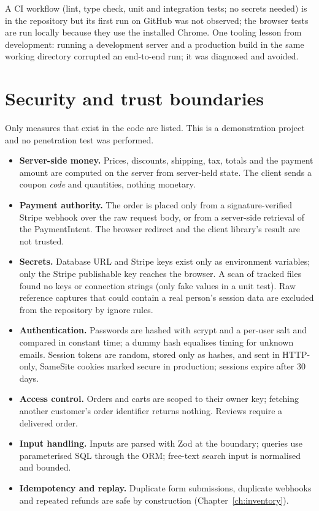 A CI workflow (lint, type check, unit and integration tests; no secrets needed) is in the repository but its first run on GitHub was not observed; the browser tests are run locally because they use the installed Chrome. One tooling lesson from development: running a development server and a production build in the same working directory corrupted an end-to-end run; it was diagnosed and avoided.

\section{Security and trust boundaries}

Only measures that exist in the code are listed. This is a demonstration project and no penetration test was performed.

\begin{itemize}
\item \textbf{Server-side money.} Prices, discounts, shipping, tax, totals and the payment amount are computed on the server from server-held state. The client sends a coupon \emph{code} and quantities, nothing monetary.
\item \textbf{Payment authority.} The order is placed only from a signature-verified Stripe webhook over the raw request body, or from a server-side retrieval of the PaymentIntent. The browser redirect and the client library's result are not trusted.
\item \textbf{Secrets.} Database URL and Stripe keys exist only as environment variables; only the Stripe publishable key reaches the browser. A scan of tracked files found no keys or connection strings (only fake values in a unit test). Raw reference captures that could contain a real person's session data are excluded from the repository by ignore rules.
\item \textbf{Authentication.} Passwords are hashed with scrypt and a per-user salt and compared in constant time; a dummy hash equalises timing for unknown emails. Session tokens are random, stored only as hashes, and sent in HTTP-only, SameSite cookies marked secure in production; sessions expire after 30 days.
\item \textbf{Access control.} Orders and carts are scoped to their owner key; fetching another customer's order identifier returns nothing. Reviews require a delivered order.
\item \textbf{Input handling.} Inputs are parsed with Zod at the boundary; queries use parameterised SQL through the ORM; free-text search input is normalised and bounded.
\item \textbf{Idempotency and replay.} Duplicate form submissions, duplicate webhooks and repeated refunds are safe by construction (Chapter~\ref{ch:inventory}).
\end{itemize}

